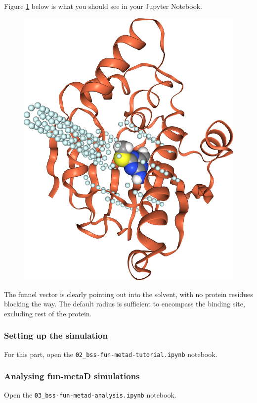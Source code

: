 Figure \ref{fig:fun-hsp90} below is what you should see in your Jupyter Notebook. 

\begin{figure}[htp]
\includegraphics[width=\linewidth]{02_funnel_metad/figures/fun-hsp90.png}
\label{fig:fun-hsp90}
\end{figure}

The funnel vector is clearly pointing out into the solvent, with no protein residues blocking the way. The default radius is sufficient to encompass the binding site, excluding rest of the protein.

\hypertarget{setting-up-the-simulation}{%
\subsubsection{Setting up the simulation}\label{setting-up-the-simulation}}

For this part, open the \texttt{02\_bss-fun-metad-tutorial.ipynb}
notebook.

\hypertarget{analysis}{%
\subsubsection{Analysing fun-metaD simulations}\label{analysis}}

Open the \texttt{03\_bss-fun-metad-analysis.ipynb} notebook.
